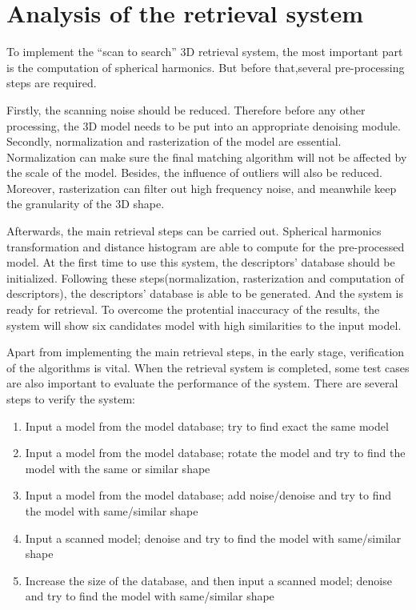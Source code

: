 \section{Analysis of the retrieval system}

To implement the ``scan to search'' 3D retrieval system, the most important part is the computation of spherical harmonics. But before that,several pre-processing steps are required. 

Firstly, the scanning noise should be reduced. Therefore before any other processing, the 3D model needs to be put into an appropriate denoising module. Secondly, normalization and rasterization of the model are essential. Normalization can make sure the final matching algorithm will not be affected by the scale of the model. Besides, the influence of outliers will also be reduced. Moreover, rasterization can filter out high frequency noise, and meanwhile keep the granularity of the 3D shape. 

Afterwards, the main retrieval steps can be carried out. Spherical harmonics transformation and distance histogram are able to compute for the pre-processed model. At the first time to use this system, the descriptors' database should be initialized. Following these steps(normalization, rasterization and computation of descriptors), the descriptors' database is able to be generated. And the system is ready for retrieval. To overcome the protential inaccuracy of the results, the system will show six candidates model with high similarities to the input model.

Apart from implementing the main retrieval steps, in the early stage, verification of the algorithms is vital. When the retrieval system is completed, some test cases are also important to evaluate the performance of the system. There are several steps to verify the system: 

\begin{enumerate}[1.]
\item Input a model from the model database; try to find exact the same model
\item Input a model from the model database; rotate the model and try to find the model with the same or similar shape
\item Input a model from the model database; add noise/denoise and try to find the model with same/similar shape
\item Input a scanned model; denoise and try to find the model with same/similar shape
\item Increase the size of the database, and then input a scanned model; denoise and try to find the model with same/similar shape
\end{enumerate}

